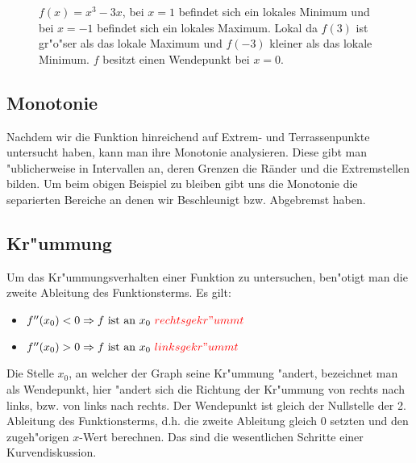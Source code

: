 \begin{figure}[h!]
\begin{center}
\end{center}
\caption{$f(x) = x^3 - 3x$, bei $x=1$ befindet sich ein lokales Minimum und bei $x=-1$ befindet sich ein lokales Maximum. Lokal da $f(3)$ ist gr"o"ser als das lokale Maximum und $f(-3)$ kleiner als das lokale Minimum. $f$ besitzt einen Wendepunkt bei $x=0$.}
\label{fig:kurvendiss}
\end{figure}

 \subsection{Monotonie}
Nachdem wir die Funktion hinreichend auf Extrem- und Terrassenpunkte untersucht haben, kann man ihre Monotonie analysieren. Diese gibt man "ublicherweise in Intervallen an, deren Grenzen die Ränder und die Extremstellen bilden. Um beim obigen Beispiel zu bleiben gibt uns die Monotonie die separierten Bereiche an denen wir Beschleunigt bzw. Abgebremst haben.

\subsection{Kr"ummung}
Um das Kr"ummungsverhalten einer Funktion zu untersuchen, ben"otigt man die zweite Ableitung des Funktionsterms. Es gilt: 
 \begin{itemize}
 \item $f''(x_0)<0 \Rightarrow f \text{ ist an } x_0 \ \textcolor{red}{rechtsgekr"ummt} $
 \item $f''(x_0)>0 \Rightarrow f \text{ ist an } x_0 \ \textcolor{red}{linksgekr"ummt}$
 \end{itemize}
Die Stelle $x_0$, an welcher der Graph seine Kr"ummung "andert, bezeichnet man als Wendepunkt, hier "andert sich die Richtung der Kr"ummung von rechts nach links, bzw. von links nach rechts. Der Wendepunkt ist gleich der Nullstelle der 2. Ableitung des Funktionsterms, d.h. die zweite Ableitung gleich $0$ setzten und den zugeh"origen $x$-Wert berechnen. Das sind die wesentlichen Schritte einer Kurvendiskussion.

